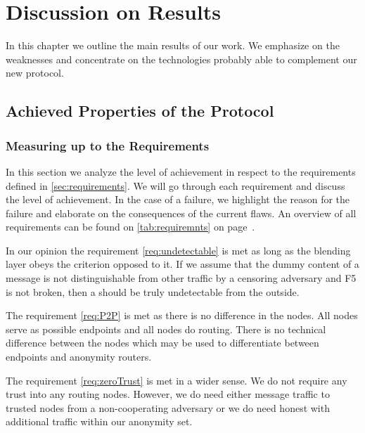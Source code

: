 \part{Discussion on Results}

In this chapter we outline the main results of our work. We emphasize on the weaknesses and concentrate on the technologies probably able to complement our new protocol.

\chapter{Achieved Properties of the Protocol}
\section{Measuring up to the Requirements\label{sec:reqDiscussion}}
In this section we analyze the level of achievement in respect to the requirements defined in \cref{sec:requirements}. We will go through each requirement and discuss the level of achievement. In the case of a failure, we highlight the reason for the failure and elaborate on the consequences of the current flaws. An overview of all requirements can be found on \cref{tab:requiremnts} on page~\pageref{tab:requiremnts}.

In our opinion the requirement \ref{req:undetectable} is met as long as the blending layer obeys the criterion opposed to it. If we assume that the dummy content of a message is not distinguishable from other traffic by a censoring adversary and F5 is not broken, then a \VortexNode{} should be truly undetectable from the outside.

The requirement \ref{req:P2P} is met as there is no difference in the nodes. All nodes serve as possible endpoints and all nodes do routing. There is no technical difference between the nodes which may be used to differentiate between endpoints and anonymity routers.

The requirement \ref{req:zeroTrust} is met in a wider sense. We do not require any trust into any routing nodes. However, we do need either message traffic to trusted nodes from a non-cooperating adversary or we do need honest \VortexNodes{} with additional traffic within our anonymity set. 

